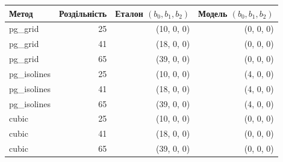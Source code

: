 \begin{tabular}{lrrr}\toprule
Метод & Роздільність & Еталон $(b_0,b_1,b_2)$ & Модель $(b_0,b_1,b_2)$ \\ \midrule
pg\_grid & 25 & (10, 0, 0) & (0, 0, 0) \\
pg\_grid & 41 & (18, 0, 0) & (0, 0, 0) \\
pg\_grid & 65 & (39, 0, 0) & (0, 0, 0) \\
pg\_isolines & 25 & (10, 0, 0) & (4, 0, 0) \\
pg\_isolines & 41 & (18, 0, 0) & (4, 0, 0) \\
pg\_isolines & 65 & (39, 0, 0) & (4, 0, 0) \\
cubic & 25 & (10, 0, 0) & (0, 0, 0) \\
cubic & 41 & (18, 0, 0) & (0, 0, 0) \\
cubic & 65 & (39, 0, 0) & (0, 0, 0) \\
\bottomrule\end{tabular}
